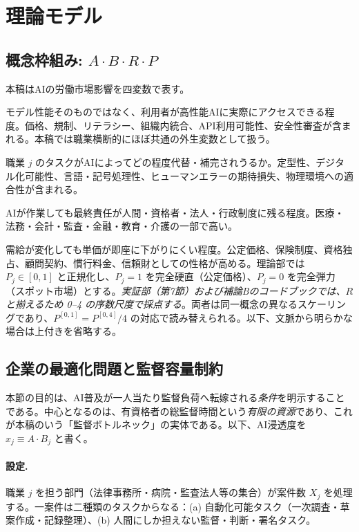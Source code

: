 \documentclass[11pt]{article}
\theoremstyle{plain}
\theoremstyle{definition}
\theoremstyle{remark}
\begin{document}
\section{理論モデル}

\subsection{概念枠組み: $A\cdot B\cdot R\cdot P$}
本稿はAIの労働市場影響を四変数で表す。

\begin{description}[leftmargin=1.4em,itemsep=2pt]
\item[$A$（AIアクセス）] モデル性能そのものではなく、利用者が高性能AIに実際にアクセスできる程度。価格、規制、リテラシー、組織内統合、API利用可能性、安全性審査が含まれる。本稿では職業横断的にほぼ共通の外生変数として扱う。
\item[$B_j$（代替可能性）] 職業 $j$ のタスクがAIによってどの程度代替・補完されうるか。定型性、デジタル化可能性、言語・記号処理性、ヒューマンエラーの期待損失、物理環境への適合性が含まれる。
\item[$R_j$（責任制約）] AIが作業しても最終責任が人間・資格者・法人・行政制度に残る程度。医療・法務・会計・監査・金融・教育・介護の一部で高い。
\item[$P_j$（価格硬直性）] 需給が変化しても単価が即座に下がりにくい程度。公定価格、保険制度、資格独占、顧問契約、慣行料金、信頼財としての性格が高める。理論部では $P_j\in[0,1]$ と正規化し、$P_j=1$ を完全硬直（公定価格）、$P_j=0$ を完全弾力（スポット市場）とする。\emph{実証部（第7節）および補論Bのコードブックでは、$R$ と揃えるため 0--4 の序数尺度で採点する}。両者は同一概念の異なるスケーリングであり、$P^{[0,1]}=P^{[0,4]}/4$ の対応で読み替えられる。以下、文脈から明らかな場合は上付きを省略する。
\end{description}

\subsection{企業の最適化問題と監督容量制約}
本節の目的は、AI普及が一人当たり監督負荷へ転嫁される\emph{条件}を明示することである。中心となるのは、有資格者の総監督時間という\emph{有限の資源}であり、これが本稿のいう「監督ボトルネック」の実体である。以下、AI浸透度を $x_j\equiv A\cdot B_j$ と書く。

\paragraph{設定.}
職業 $j$ を担う部門（法律事務所・病院・監査法人等の集合）が案件数 $X_j$ を処理する。一案件は二種類のタスクからなる：(a) 自動化可能タスク（一次調査・草案作成・記録整理）、(b) 人間にしか担えない監督・判断・署名タスク。
\end{document}
